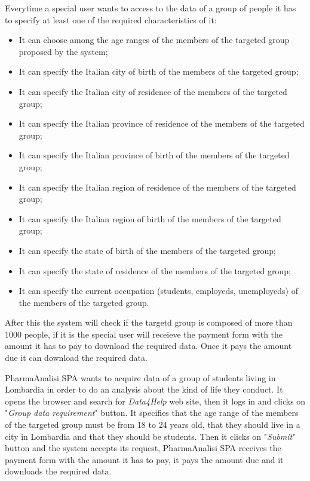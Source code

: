 Everytime a special user wants to access to the data of a group of people it has to specify at least one of the required characteristics of it:
\begin{itemize}
  \item It can choose among the age ranges of the members of the targeted group proposed by the system;
  \item It can specify the Italian city of birth of the members of the targeted group;
  \item It can specify the Italian city of residence of the members of the targeted group;
  \item It can specify the Italian province of residence of the members of the targeted group;
  \item It can specify the Italian province of birth of the members of the targeted group;
  \item It can specify the Italian region of residence of the members of the targeted group;
  \item It can specify the Italian region of birth of the members of the targeted group;
  \item It can specify the state of birth of the members of the targeted group;
  \item It can specify the state of residence of the members of the targeted group;
  \item It can specify the current occupation (students, employeds, unemployeds) of the members of the targeted group.
\end{itemize}
After this the system will check if the targetd group is composed of more than 1000 people, if it is the special user will receieve the payment form with the amount it has to pay to download the required data. Once it pays the amount due it can download the required data.

PharmaAnalisi SPA wants to acquire data of a group of students living in Lombardia in order to do an analysis about the kind of life they conduct. It opens the browser and search for \textit{Data4Help} web site, then it logs in and clicks on "\textit{Group data requirement}" button. It specifies that the age range of the members of the targeted group must be from 18 to 24 years old, that they should live in a city in Lombardia and that they should be students. Then it clicks on "\textit{Submit}" button and the system accepts its request, PharmaAnalisi SPA receives the payment form with the amount it has to pay, it pays the amount due and it downloads the required data.


